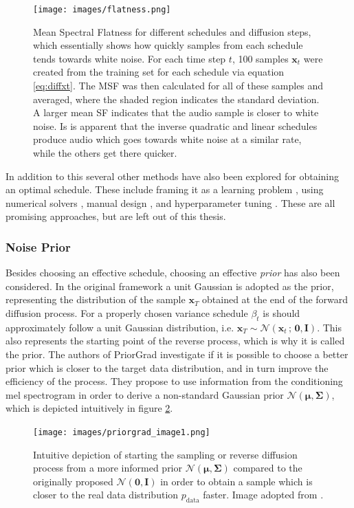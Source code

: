 \documentclass{report}
\begin{document}
\begin{figure}[H]
    \centering
    \texttt{[image: images/flatness.png]}
    \caption{\onehalfspacing Mean Spectral Flatness for different schedules and diffusion steps, which essentially shows how quickly samples from each schedule tends towards white noise. For each time step $t$, 100 samples $\bm{x}_t$ were created from the training set for each schedule via equation \ref{eq:diffxt}. The MSF was then calculated for all of these samples and averaged, where the shaded region indicates the standard deviation. A larger mean SF indicates that the audio sample is closer to white noise. Is is apparent that the inverse quadratic and linear schedules produce audio which goes towards white noise at a similar rate, while the others get there quicker.}
    \label{fig:flatness}
\end{figure}

In addition to this several other methods have also been explored for obtaining an optimal schedule. These include framing it as a learning problem \cite{watson2021learning, lam2022bddm}, using numerical solvers \cite{jolicoeur2021gotta}, manual design \cite{chen2020wavegrad}, and hyperparameter tuning \cite{chen2022infergrad}. These are all promising approaches, but are left out of this thesis.

\subsubsection{Noise Prior}
Besides choosing an effective schedule, choosing an effective \textit{prior} has also been considered. In the original framework a unit Gaussian is adopted as the prior, representing the distribution of the sample $\textbf{x}_T$ obtained at the end of the forward diffusion process. For a properly chosen variance schedule $\beta_t$ is should approximately follow a unit Gaussian distribution, i.e. $\bm{x}_T \sim \mathcal{N}(\bm{x}_t \, ; \, \bm{0}, \bm{I})$. This also represents the starting point of the reverse process, which is why it is called the prior. The authors of PriorGrad \cite{lee2021priorgrad} investigate if it is possible to choose a better prior which is closer to the target data distribution, and in turn improve the efficiency of the process. They propose to use information from the conditioning mel spectrogram in order to derive a non-standard Gaussian prior $\mathcal{N}(\bm{\mu}, \bm{\Sigma})$, which is depicted intuitively in figure \ref{fig:priorgrad1}.

\begin{figure}[H]
    \centering
    \texttt{[image: images/priorgrad\_image1.png]}
    \caption{\onehalfspacing Intuitive depiction of starting the sampling or reverse diffusion process from a more informed prior $\mathcal{N}(\bm{\mu}, \bm{\Sigma})$ compared to the originally proposed $\mathcal{N}(\bm{0}, \bm{I})$ in order to obtain a sample which is closer to the real data distribution $p_{\text{data}}$ faster. Image adopted from \cite{lee2021priorgrad}.}
    \label{fig:priorgrad1}
\end{figure}
\end{document}
